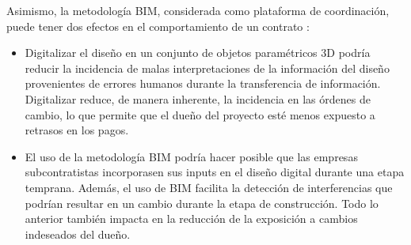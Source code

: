 Asimismo, la metodología BIM, considerada como plataforma de coordinación, puede tener dos efectos en el comportamiento de un contrato \cite{chang2014economic}: 

\begin{itemize}
    \item Digitalizar el diseño en un conjunto de objetos paramétricos 3D podría reducir la incidencia de malas interpretaciones de la información del diseño provenientes de errores humanos durante la transferencia de información. Digitalizar reduce, de manera inherente, la incidencia en las órdenes de cambio, lo que permite que el dueño del proyecto esté menos expuesto a retrasos en los pagos.
    \item El uso de la metodología BIM podría hacer posible que las empresas subcontratistas incorporasen sus inputs en el diseño digital durante una etapa temprana. Además, el uso de BIM facilita la detección de interferencias que podrían resultar en un cambio durante la etapa de construcción. Todo lo anterior también impacta en la reducción de la exposición a cambios indeseados del dueño.
\end{itemize}
